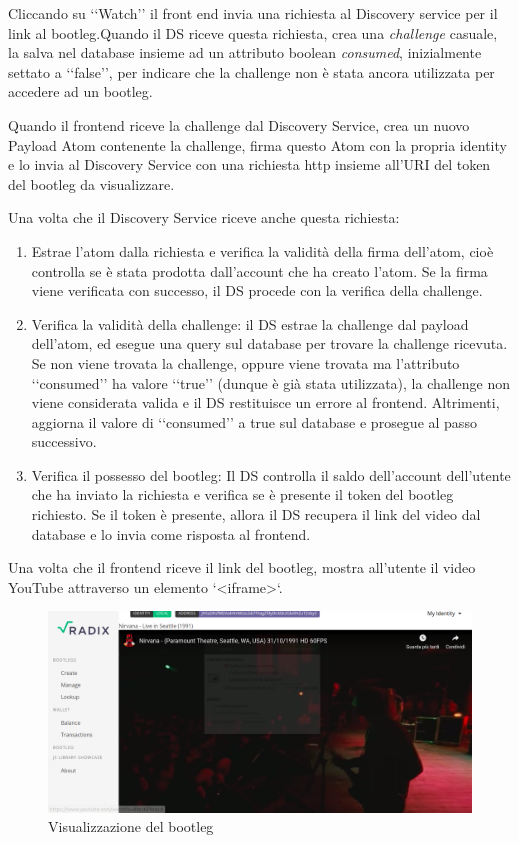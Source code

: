 Cliccando su ‘‘Watch’’ il front end invia una richiesta al Discovery service per il link al bootleg.Quando il DS riceve questa richiesta, crea una \textit{challenge} casuale, la salva nel database insieme ad un attributo boolean \textit{consumed}, inizialmente settato a ‘‘false’’, per indicare che la challenge non è stata ancora utilizzata per accedere ad un bootleg. 

Quando il frontend riceve la challenge dal Discovery Service, crea un nuovo Payload Atom contenente la challenge, firma questo Atom con la propria identity e lo invia al Discovery Service con una richiesta http insieme all'URI del token del bootleg da visualizzare.

Una volta che il Discovery Service riceve anche questa richiesta:
\begin{enumerate}
    \item Estrae l'atom dalla richiesta e verifica la validità della firma dell'atom, cioè controlla se è stata prodotta dall'account che ha creato l'atom. Se la firma viene verificata con successo, il DS procede con la verifica della challenge.
    \item Verifica la validità della challenge: il DS estrae la challenge dal payload dell'atom, ed esegue una query sul database per trovare la challenge ricevuta. Se non viene trovata la challenge, oppure viene trovata ma l'attributo ‘‘consumed’’ ha valore ‘‘true’’ (dunque è già stata utilizzata), la challenge non viene considerata valida e il DS restituisce un errore al frontend. Altrimenti, aggiorna il valore di ‘‘consumed’’ a true sul database e prosegue al passo successivo.
    \item Verifica il possesso del bootleg: Il DS controlla il saldo dell'account dell'utente che ha inviato la richiesta e verifica se è presente il token del bootleg richiesto. Se il token è presente, allora il DS recupera il link del video dal database e lo invia come risposta al frontend.
\end{enumerate}

Una volta che il frontend riceve il link del bootleg, mostra all'utente il video YouTube attraverso un elemento `<iframe>`.
\begin{figure}[H]
    \includegraphics[width=\linewidth]{images/application/watch.png}
    \caption{Visualizzazione del bootleg}
    \label{fig:watch}
\end{figure}

